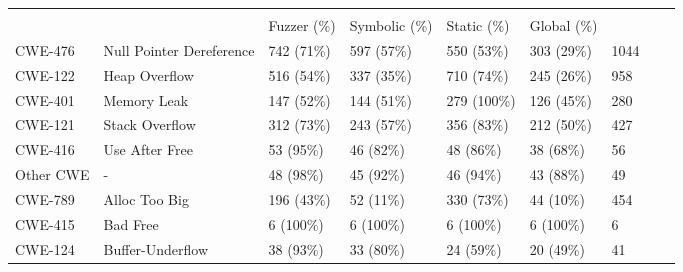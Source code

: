 \begin{tabular}{lllllll}
\hline
  &  &  &  &             &             &      \\
                                 &                                         & Fuzzer (\%)                               & Symbolic (\%)                                      & Static (\%) & Global (\%) &      \\
 CWE-476                         & Null Pointer Dereference                & 742 (71\%)                                & 597 (57\%)                                         & 550 (53\%)  & 303 (29\%)  & 1044 \\
 CWE-122                         & Heap Overflow                           & 516 (54\%)                                & 337 (35\%)                                         & 710 (74\%)  & 245 (26\%)  & 958  \\
 CWE-401                         & Memory Leak                             & 147 (52\%)                                & 144 (51\%)                                         & 279 (100\%) & 126 (45\%)  & 280  \\
 CWE-121                         & Stack Overflow                          & 312 (73\%)                                & 243 (57\%)                                         & 356 (83\%)  & 212 (50\%)  & 427  \\
 CWE-416                         & Use After Free                          & 53 (95\%)                                 & 46 (82\%)                                          & 48 (86\%)   & 38 (68\%)   & 56   \\
 Other CWE                       & -                                       & 48 (98\%)                                 & 45 (92\%)                                          & 46 (94\%)   & 43 (88\%)   & 49   \\
 CWE-789                         & Alloc Too Big                           & 196 (43\%)                                & 52 (11\%)                                          & 330 (73\%)  & 44 (10\%)   & 454  \\
 CWE-415                         & Bad Free                                & 6 (100\%)                                 & 6 (100\%)                                          & 6 (100\%)   & 6 (100\%)   & 6    \\
 CWE-124                         & Buffer-Underflow                        & 38 (93\%)                                 & 33 (80\%)                                          & 24 (59\%)   & 20 (49\%)   & 41   \\
\hline
\end{tabular}
